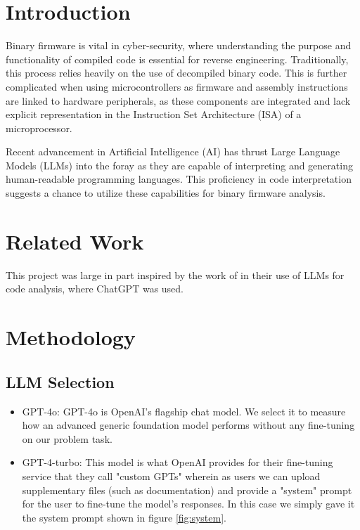 \section{Introduction}

Binary firmware is vital in cyber-security, where understanding the purpose and functionality of compiled code is essential for reverse engineering. Traditionally, this process relies heavily on the use of decompiled binary code. This is further complicated when using microcontrollers as firmware and assembly instructions are linked to hardware peripherals, as these components are integrated and lack explicit representation in the Instruction Set Architecture (ISA) of a microprocessor.

Recent advancement in Artificial Intelligence (AI) has thrust Large Language Models (LLMs) into the foray as they are capable of interpreting and generating human-readable programming languages. This proficiency in code interpretation suggests a chance to utilize these capabilities for binary firmware analysis.






\section{Related Work}

This project was large in part inspired by the work of \cite{fang2024large} in
their use of LLMs for code analysis, where ChatGPT was used.

\section{Methodology}

\subsection{LLM Selection}

\begin{itemize}
  \item GPT-4o: GPT-4o is OpenAI's flagship chat model. We select it to measure
  how an advanced generic foundation model performs without any fine-tuning on
  our problem task.

  \item GPT-4-turbo: This model is what OpenAI provides for their fine-tuning
  service that they call "custom GPTs" wherein as users we can upload
  supplementary files (such as documentation) and provide a "system" prompt for
  the user to fine-tune the model's responses. In this case we simply gave it the system prompt shown in figure \ref{fig:system}.
\end{itemize}


